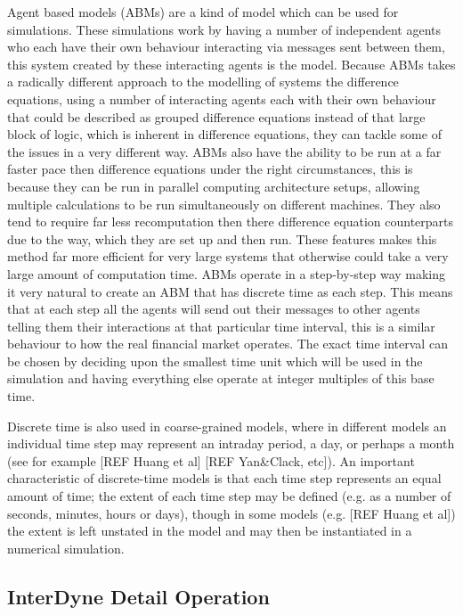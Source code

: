 \documentclass{article}
\begin{document}
Agent based models (ABMs) are a kind of model which can be used for simulations. These simulations work by having a number of independent agents who each have their own behaviour interacting via messages sent between them, this system created by these interacting agents is the model. 
Because ABMs takes a radically different approach to the modelling of systems the difference equations, using a number of interacting agents each with their own behaviour that could be described as grouped difference equations instead of that large block of logic, which is inherent in difference equations, they can tackle some of the issues in a very different way. 
ABMs also have the ability to be run at a far faster pace then difference equations under the right circumstances, this is because they can be run in parallel computing architecture setups, allowing multiple calculations to be run simultaneously on different machines. 
They also tend to require far less recomputation then there difference equation counterparts due to the way, which they are set up and then run.
These features makes this method far more efficient for very large systems that otherwise could take a very large amount of computation time.  
ABMs operate in a step-by-step way making it very natural to create an ABM that has discrete time as each step. This means that at each step all the agents will send out their messages to other agents telling them their interactions at that particular time interval, this is a similar behaviour to how the real financial market operates. The exact time interval can be chosen by deciding upon the smallest time unit which will be used in the simulation and having everything else operate at integer multiples of this base time.


Discrete time is also used in coarse-grained models, where in different models an individual time step may represent an intraday period, a day, or perhaps a month (see for example [REF Huang et al] [REF Yan&Clack, etc]).  An important characteristic of discrete-time models is that each time step represents an equal amount of time; the extent of each time step may be defined (e.g. as a number of seconds, minutes, hours or days), though in some models (e.g. [REF Huang et al]) the extent is left unstated in the model and may then be instantiated in a numerical simulation. 


\subsection{InterDyne Detail Operation}
\end{document}
